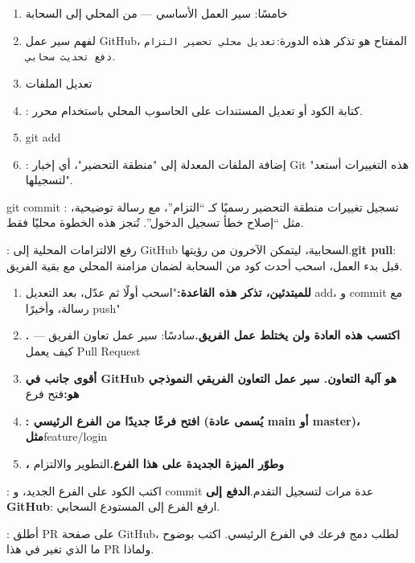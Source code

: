 \begin{enumerate}
  \item خامسًا: سير العمل الأساسي — من المحلي إلى السحابة
  \item لفهم سير عمل GitHub، المفتاح هو تذكر هذه الدورة:\texttt{تعديل محلي تحضير التزام دفع تحديث سحابي}.
  \item تعديل الملفات
  \item : كتابة الكود أو تعديل المستندات على الحاسوب المحلي باستخدام محرر.
  \item git add
  \item : إضافة الملفات المعدلة إلى "منطقة التحضير"، أي إخبار Git "هذه التغييرات أستعد لتسجيلها".
\end{enumerate}

\begin{tcbinfo}{git commit}
: تسجيل تغييرات منطقة التحضير رسميًا كـ “التزام”، مع رسالة توضيحية، مثل “إصلاح خطأ تسجيل الدخول”. تُنجز هذه الخطوة محليًا فقط.

\end{tcbinfo}


: رفع الالتزامات المحلية إلى GitHub السحابية، ليتمكن الآخرون من رؤيتها.\textbf{git pull}: قبل بدء العمل، اسحب أحدث كود من السحابة لضمان مزامنة المحلي مع بقية الفريق.

\begin{enumerate}
  \item \textbf{للمبتدئين، تذكر هذه القاعدة:}"اسحب أولًا ثم عدّل، بعد التعديل add، و commit مع رسالة، وأخيرًا push"
  \item \textbf{. اكتسب هذه العادة ولن يختلط عمل الفريق.}سادسًا: سير عمل تعاون الفريق — كيف يعمل Pull Request
  \item \textbf{أقوى جانب في GitHub هو آلية التعاون. سير عمل التعاون الفريقي النموذجي هو:}فتح فرع
  \item \textbf{: افتح فرعًا جديدًا من الفرع الرئيسي (يُسمى عادة main أو master)، مثل}feature/login
  \item \textbf{، وطوّر الميزة الجديدة على هذا الفرع.}التطوير والالتزام
\end{enumerate}

: اكتب الكود على الفرع الجديد، و commit عدة مرات لتسجيل التقدم.\textbf{الدفع إلى GitHub}: ارفع الفرع إلى المستودع السحابي.


: أطلق PR على صفحة GitHub، لطلب دمج فرعك في الفرع الرئيسي. اكتب بوضوح ما الذي تغير في هذا PR ولماذا.

